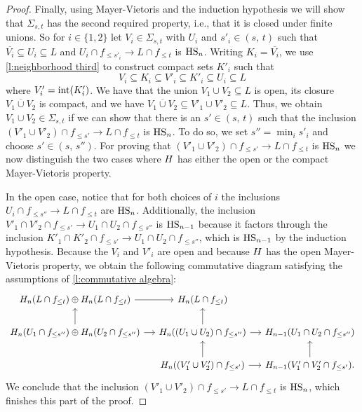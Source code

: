 \begin{proof}
	Finally, using Mayer-Vietoris and the induction hypothesis we will show that $\Sigma_{s,t}$ has the second required property, i.e., that it is closed under finite unions.
	So for $i \in \{1, 2\}$ let $V_i \in \Sigma_{s,t}$ with $U_i$ and $s'_i \in (s,\, t)$ such that 
	$\overline{V_i} \subseteq U_i \subseteq L$ 
	and
	$U_{i} \cap f_{\leq s'_i} \to L \cap f_{\leq t}$
	is $\mathrm{HS}_n$.
	Writing $K_i = \overline{V_i}$, we use \cref{l:neighborhood third} to construct compact sets $K'_i$ such that
	\begin{equation*}
	V_i \subseteq K_i \subseteq V'_i \subseteq K'_i \subseteq U_i \subseteq L
	\end{equation*}
	where $V'_i = \operatorname{int}(K'_i)$.
	We have that the union $V_1 \cup V_2 \subseteq L$ is open, its closure $\overline{V_1 \cup V_2}$ is compact, and we have $\overline{V_1 \cup V_2} \subseteq V'_1 \cup V'_2 \subseteq L$.
	Thus, we obtain $V_1 \cup V_2 \in \Sigma_{s,t}$ if we can show that there is an $s' \in (s,\, t)$ such that the inclusion 
	$\left(V'_1 \cup V'_2 \right) \cap f_{\leq s'} \to L \cap f_{\leq t}$
	is $\mathrm{HS}_n$.
	To do so, we set $s'' = \min_i s'_i$ and choose $s' \in (s,\, s'')$.
	For proving that $\left(V'_1 \cup V'_2 \right) \cap f_{\leq s'} \to L \cap f_{\leq t}$ is $\mathrm{HS}_n$ we now distinguish the two cases where $H$ has either the open or the compact Mayer-Vietoris property.
	
	In the open case, notice that for both choices of $i$ the inclusions
	$U_i \cap f_{\leq s''} \to L \cap f_{\leq t}$
	are $\mathrm{HS}_n$.
	Additionally, the inclusion
	$V'_1 \cap V'_2 \cap f_{\leq s'} \to U_1 \cap U_2 \cap f_{\leq s''}$
	is $\mathrm{HS}_{n-1}$ because it factors through the inclusion
	$K'_1 \cap K'_2 \cap f_{\leq s'} \to U_1 \cap U_2 \cap f_{\leq s''}$,
	which is $\mathrm{HS}_{n-1}$ by the induction hypothesis.
    Because the $V_i$ and $V'_i$ are open and because $H$ has the open Mayer-Vietoris property, we obtain the following commutative diagram satisfying the assumptions of \cref{l:commutative algebra}:
	\begin{equation*}
	\begin{tikzcd}[column sep=small]
	\H_n(L \cap f_{\leq t}) \oplus \H_n(L \cap f_{\leq t}) \arrow[r] &
	\H_n(L \cap f_{\leq t}) & \\
	\H_{n}(U_1 \cap f_{\leq s''}) \oplus \H_n(U_2 \cap f_{\leq s''}) \arrow[r] \arrow[u] & 
	\H_{n}((U_1 \cup U_2) \cap f_{\leq s''}) \arrow[r] \arrow[u] &
	\H_{n-1}(U_1 \cap U_2 \cap f_{\leq s''}) \\ & 
	\H_{n}((V'_1 \cup V'_2) \cap f_{\leq s'}) \arrow[r] \arrow[u] &
	\H_{n-1}(V'_1 \cap V'_2 \cap f_{\leq s'}). \arrow[u]
	\end{tikzcd}
	\end{equation*}
	We conclude that the inclusion 
	$\left(V'_1 \cup V'_2 \right) \cap f_{\leq s'} \to L \cap f_{\leq t}$ 
	is $\mathrm{HS}_n$, which finishes this part of the proof.
	

\end{proof}
